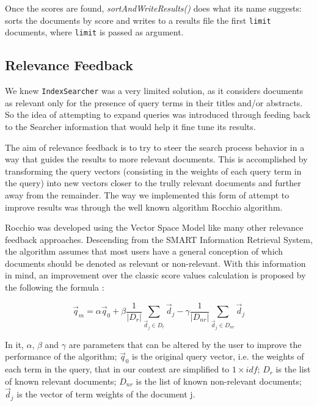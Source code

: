 \documentclass[12pt]{article}
\begin{document}
Once the scores are found, \textit{sortAndWriteResults()} does what its name 
suggests: sorts the documents by score and writes to a results file the first 
\texttt{limit} documents, where \texttt{limit} is passed as argument.

\subsection{Relevance Feedback}\label{rocchio}

We knew \texttt{IndexSearcher} was a very limited solution, as it considers 
documents as relevant only for the presence of query terms in their titles 
and/or abstracts.
So the idea of attempting to expand queries was introduced through feeding back
to the Searcher information that would help it fine tune its results.

The aim of relevance feedback is to try to steer the search process behavior 
in a way that guides the results to more relevant documents.
This is accomplished by transforming the query vectors (consisting in the weights 
of each query term in the query) into new vectors closer to the trully
relevant documents and further away from the remainder.
The way we implemented this form of attempt to improve results was through the
well known algorithm Rocchio algorithm.

Rocchio was developed using the Vector Space Model like many other relevance 
feedback approaches. 
Descending from the SMART Information Retrieval System, the algorithm assumes 
that most users have a general conception of which documents should be denoted 
as relevant or non-relevant. 
With this information in mind, an improvement over the classic score values 
calculation is proposed by the following the formula \cite{rocchio}:

\vspace{-10pt}
\begin{equation}
  \vec{q}_{m} = \alpha\vec{q}_{0} + \beta\frac{1}{|D_{r}|} \sum_{ \vec{d}_{j} \in D_{r}} \vec{d}_{j} - \gamma\frac{1}{|D_{nr}|} \sum_{ \vec{d}_{j} \in D_{nr}} \vec{d}_{j}
\end{equation}
 
In it, $\alpha$, $\beta$ and $\gamma$ are parameters that can be altered by the 
user to improve the performance of the algorithm;
$\vec{q}_{0}$ is the original query vector, i.e. the weights of each term 
in the query, that in our context are simplified to $1 \times idf$; 
$D_{r}$ is the list of known relevant documents;
$D_{nr}$ is the list of known non-relevant documents; 
$\vec{d}_{j}$ is the vector of term weights of the document j.
\end{document}
